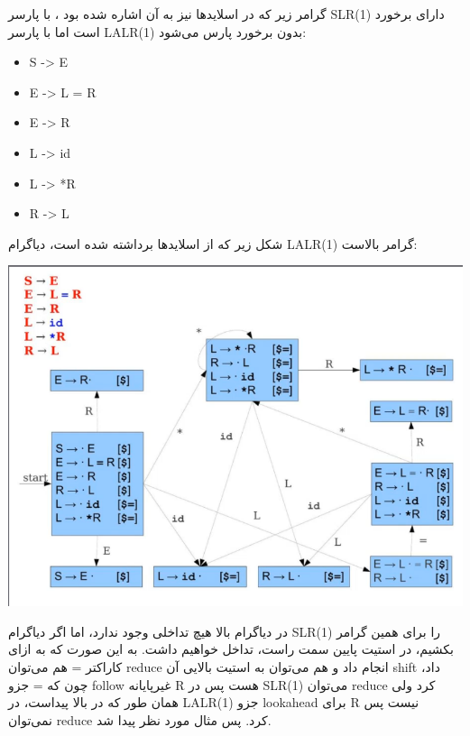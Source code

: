 گرامر زیر که در اسلایدها نیز به آن اشاره شده بود ، با پارسر SLR(1) دارای برخورد است اما با پارسر 
LALR(1)
بدون برخورد پارس می‌شود:
\begin{latin}
\begin{itemize}
    \item 
    S -> E
    \item
    E -> L = R
    \item
    E -> R
    \item
    L -> id
    \item
    L -> *R
    \item
    R -> L
\end{itemize}
\end{latin}
شکل زیر که از اسلایدها برداشته شده است، دیاگرام LALR(1) گرامر بالاست:
\graphicspath{{./images/}}
\begin{center}
	\includegraphics[scale=0.7]{example_diag.png}
\end{center}
در دیاگرام بالا هیچ تداخلی وجود ندارد، اما اگر دیاگرام SLR(1) را برای همین گرامر بکشیم، در استیت پایین سمت راست، تداخل خواهیم داشت. به این صورت که به ازای کاراکتر = هم می‌توان reduce انجام داد و هم می‌توان به استیت بالایی آن shift داد، چون که = جزو follow غیرپایانه R هست پس در SLR(1) می‌توان reduce کرد ولی همان طور که در بالا پیداست، در LALR(1) جزو lookahead برای R نیست پس نمی‌توان reduce کرد. پس مثال مورد نظر پیدا شد.




